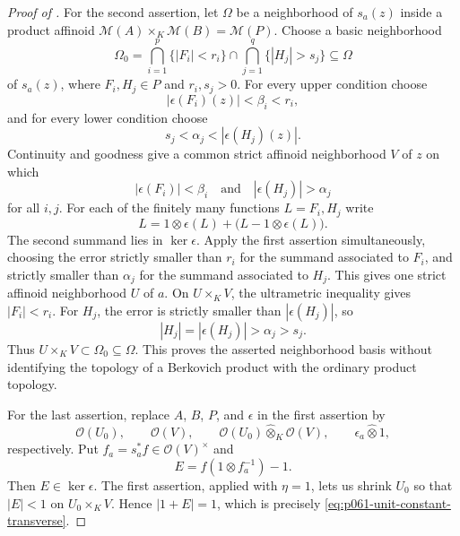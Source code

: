 \begin{proof}[Proof of ]
For the second assertion, let \(\Omega\) be a neighborhood of \(s_a(z)\)
inside a product affinoid
\(\mathcal M(A)\times_K\mathcal M(B)=\mathcal M(P)\).  Choose a basic
neighborhood
\[
 \Omega_0=
 \bigcap_{i=1}^p\{|F_i|<r_i\}
 \cap
 \bigcap_{j=1}^q\{|H_j|>s_j\}
 \subseteq\Omega
\]
of \(s_a(z)\), where \(F_i,H_j\in P\) and \(r_i,s_j>0\).  For every
upper condition choose
\[
                  |\epsilon(F_i)(z)|<\beta_i<r_i,
\]
and for every lower condition choose
\[
                  s_j<\alpha_j<|\epsilon(H_j)(z)|.
\]
Continuity and goodness give a common strict affinoid neighborhood \(V\)
of \(z\) on which
\[
       |\epsilon(F_i)|<\beta_i
       \quad\text{and}\quad
       |\epsilon(H_j)|>\alpha_j
\]
for all \(i,j\).  For each of the finitely many functions \(L=F_i,H_j\)
write
\begin{equation}
\label{eq:p061-tensor-section-split}
                L=1\otimes\epsilon(L)
                  +\bigl(L-1\otimes\epsilon(L)\bigr).
\end{equation}
The second summand lies in \(\ker\epsilon\).  Apply the first assertion
simultaneously, choosing the error strictly smaller than \(r_i\) for the
summand associated to \(F_i\), and strictly smaller than \(\alpha_j\) for
the summand associated to \(H_j\).  This gives one strict affinoid
neighborhood \(U\) of \(a\).  On \(U\times_KV\), the ultrametric
inequality gives \(|F_i|<r_i\).  For \(H_j\), the error is strictly
smaller than \(|\epsilon(H_j)|\), so
\[
                         |H_j|=|\epsilon(H_j)|>\alpha_j>s_j.
\]
Thus \(U\times_KV\subset\Omega_0\subseteq\Omega\).  This proves the
asserted neighborhood basis without identifying the topology of a
Berkovich product with the ordinary product topology.

For the last assertion, replace \(A\), \(B\), \(P\), and \(\epsilon\) in
the first assertion by
\[
 \mathcal O(U_0),\qquad \mathcal O(V),\qquad
 \mathcal O(U_0)\widehat\otimes_K\mathcal O(V),\qquad
 \epsilon_a\widehat\otimes1,
\]
respectively.  Put \(f_a=s_a^*f\in\mathcal O(V)^\times\) and
\[
                       E=f(1\otimes f_a^{-1})-1.
\]
Then \(E\in\ker\epsilon\).  The first assertion, applied with
\(\eta=1\), lets us shrink \(U_0\) so that \(|E|<1\) on
\(U_0\times_KV\).  Hence \(|1+E|=1\), which is precisely
\eqref{eq:p061-unit-constant-transverse}.
\end{proof}

